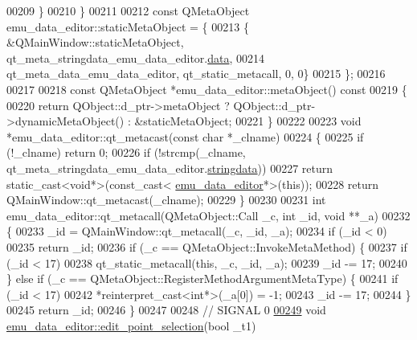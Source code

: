 \begin{DoxyCode}
00209     \}
00210 \}
00211 
00212 \textcolor{keyword}{const} QMetaObject emu\_data\_editor::staticMetaObject = \{
00213     \{ &QMainWindow::staticMetaObject, qt\_meta\_stringdata\_emu\_data\_editor.\hyperlink{a00014_a91db052cb5a1fcce8e53e81902e8e90b}{data},
00214       qt\_meta\_data\_emu\_data\_editor,  qt\_static\_metacall, 0, 0\}
00215 \};
00216 
00217 
00218 \textcolor{keyword}{const} QMetaObject *emu\_data\_editor::metaObject()\textcolor{keyword}{ const}
00219 \textcolor{keyword}{}\{
00220     \textcolor{keywordflow}{return} QObject::d\_ptr->metaObject ? QObject::d\_ptr->dynamicMetaObject() : &staticMetaObject;
00221 \}
00222 
00223 \textcolor{keywordtype}{void} *emu\_data\_editor::qt\_metacast(\textcolor{keyword}{const} \textcolor{keywordtype}{char} *\_clname)
00224 \{
00225     \textcolor{keywordflow}{if} (!\_clname) \textcolor{keywordflow}{return} 0;
00226     \textcolor{keywordflow}{if} (!strcmp(\_clname, qt\_meta\_stringdata\_emu\_data\_editor.\hyperlink{a00014_ae988ab8add535bff49a0c5d5ec714851}{stringdata}))
00227         \textcolor{keywordflow}{return} \textcolor{keyword}{static\_cast<}\textcolor{keywordtype}{void}*\textcolor{keyword}{>}(\textcolor{keyword}{const\_cast<} \hyperlink{a00004}{emu\_data\_editor}*\textcolor{keyword}{>}(\textcolor{keyword}{this}));
00228     \textcolor{keywordflow}{return} QMainWindow::qt\_metacast(\_clname);
00229 \}
00230 
00231 \textcolor{keywordtype}{int} emu\_data\_editor::qt\_metacall(QMetaObject::Call \_c, \textcolor{keywordtype}{int} \_id, \textcolor{keywordtype}{void} **\_a)
00232 \{
00233     \_id = QMainWindow::qt\_metacall(\_c, \_id, \_a);
00234     \textcolor{keywordflow}{if} (\_id < 0)
00235         \textcolor{keywordflow}{return} \_id;
00236     \textcolor{keywordflow}{if} (\_c == QMetaObject::InvokeMetaMethod) \{
00237         \textcolor{keywordflow}{if} (\_id < 17)
00238             qt\_static\_metacall(\textcolor{keyword}{this}, \_c, \_id, \_a);
00239         \_id -= 17;
00240     \} \textcolor{keywordflow}{else} \textcolor{keywordflow}{if} (\_c == QMetaObject::RegisterMethodArgumentMetaType) \{
00241         \textcolor{keywordflow}{if} (\_id < 17)
00242             *\textcolor{keyword}{reinterpret\_cast<}\textcolor{keywordtype}{int}*\textcolor{keyword}{>}(\_a[0]) = -1;
00243         \_id -= 17;
00244     \}
00245     \textcolor{keywordflow}{return} \_id;
00246 \}
00247 
00248 \textcolor{comment}{// SIGNAL 0}
\hypertarget{a00014_source_l00249}{}\hyperlink{a00004_a9aa2af0c329358fd96f7fb6b7f02bfe1}{00249} \textcolor{keywordtype}{void} \hyperlink{a00004_a9aa2af0c329358fd96f7fb6b7f02bfe1}{emu\_data\_editor::edit\_point\_selection}(\textcolor{keywordtype}{bool} \_t1)

\end{DoxyCode}
